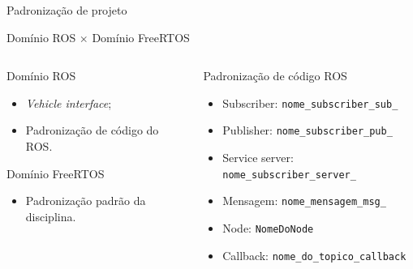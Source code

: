 \documentclass{if-beamer}
\begin{document}
\begin{frame}{Padronização de projeto}
	
	\begin{block}{}
		\centering
		\vspace{1mm}
		Domínio ROS $\times$ Domínio FreeRTOS
		\vspace{1mm}
		
	\end{block}
	
	\pause
	
	\begin{columns}
		
		\begin{column}{0.32\textwidth}
			
			\begin{block}{Domínio ROS}
				
				\begin{itemize}
					\item \textit{Vehicle interface};
					\item Padronização de código do ROS.
				\end{itemize}
				
			\end{block}
			
			\pause
		
			\begin{block}{Domínio FreeRTOS}
			
				\begin{itemize}
					\item Padronização padrão da disciplina.
				\end{itemize}
			
			\end{block}
			
			\pause
			
		\end{column}
		
		\begin{column}{0.55\textwidth}
			
			\begin{block}{Padronização de código ROS}
				
				\begin{itemize}
					\item Subscriber: \texttt{nome\_subscriber\_sub\_}
					\item Publisher: \texttt{nome\_subscriber\_pub\_}
					\item Service server: \texttt{nome\_subscriber\_server\_}
					\item Mensagem: \texttt{nome\_mensagem\_msg\_}
					\item Node: \texttt{NomeDoNode}
					\item Callback: \texttt{nome\_do\_topico\_callback}
					

\end{itemize}
\end{block}
\end{column}
\end{columns}
\end{frame}
\end{document}
